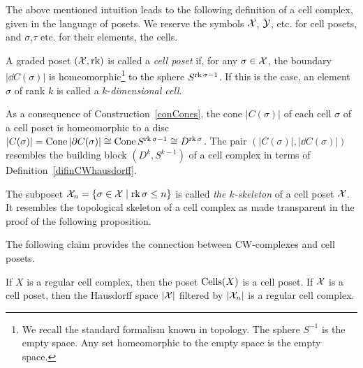 The above mentioned intuition leads to the following definition of a cell complex, given in the language of posets. We reserve the symbols $\mathcal{X}$, $\mathcal{Y}$, etc. for cell posets, and $\sigma$,$\tau$ etc. for their elements, the cells.

\begin{defin}\label{definCellPoset}
A graded poset $(\mathcal{X},\operatorname{rk})$ is called a \emph{cell poset} if, for any $\sigma\in \mathcal{X}$, the boundary $|\dd C(\sigma)|$ is homeomorphic\footnote{We recall the standard formalism known in topology. The sphere $S^{-1}$ is the empty space. Any set homeomorphic to the empty space is the empty space.} to the sphere $S^{\operatorname{rk}\sigma-1}$. If this is the case, an element $\sigma$ of rank $k$ is called a $k$-\emph{dimensional cell}.
\end{defin}

\begin{rem}
As a consequence of Construction~\ref{conCones}, the cone $|C(\sigma)|$ of each cell $\sigma$ of a cell poset is homeomorphic to a disc $|C(\sigma)|=\operatorname{Cone}|\partial C(\sigma)|\cong \operatorname{Cone} S^{\operatorname{rk} \sigma-1}\cong D^{\operatorname{rk} \sigma}$. The pair $(|C(\sigma)|,|\dd C(\sigma)|)$ resembles the building block $(D^k,S^{k-1})$ of a cell complex in terms of Definition~\ref{difinCWhausdorff}.
\end{rem}

\begin{con}\label{conCellPosetSkeleton}
The subposet $\mathcal{X}_n=\{\sigma\in \mathcal{X}\mid \operatorname{rk} \sigma\leq n\}$ is called \emph{the $k$-skeleton} of a cell poset $\mathcal{X}$. It resembles the topological skeleton of a cell complex as made transparent in the proof of the following proposition.
\end{con}

The following claim provides the connection between CW-complexes and cell posets.

\begin{prop}\label{propCellPosetToCpx}
If $X$ is a regular cell complex, then the poset $\operatorname{Cells}(X)$ is a cell poset. If $\mathcal{X}$ is a cell poset, then the Hausdorff space $|\mathcal{X}|$ filtered by $|\mathcal{X}_n|$ is a regular cell complex.
\end{prop}

